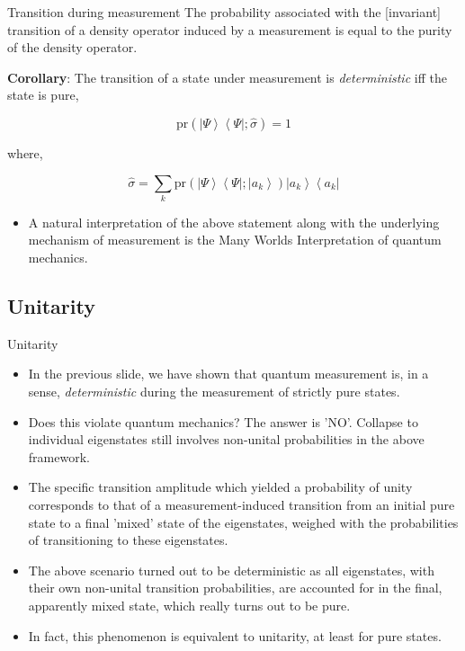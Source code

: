 \documentclass[9pt,handout]{beamer}
\newcommand{\pr}[0]{\text{pr}}
\begin{document}
\begin{frame}{}
\begin{block}{Transition during measurement}
The probability associated with the [invariant] transition of a density operator induced by a measurement is equal to the purity of the density operator.

\textbf{Corollary}: The transition of a state under measurement is \emph{deterministic} iff the state is pure,

$$\pr \left( \left\lvert \Psi \right\rangle \left\langle \Psi \right\rvert; \widehat{\sigma} \right) = 1$$

where,

$$\widehat{\sigma} = \sum_k \pr \left( \left\lvert \Psi \right\rangle \left\langle \Psi \right\rvert; \left\lvert a_k \right\rangle \right) \left\lvert a_k \right\rangle \left\langle a_k \right\rvert$$
\end{block}

\begin{itemize}
\item A natural interpretation of the above statement along with the underlying mechanism of measurement is the Many Worlds Interpretation of quantum mechanics.
\end{itemize}
\end{frame}

\subsection{Unitarity}
\begin{frame}{Unitarity}
\begin{itemize}
\item In the previous slide, we have shown that quantum measurement is, in a sense, \emph{deterministic} during the measurement of strictly pure states.

\item Does this violate quantum mechanics? The answer is 'NO'. 
Collapse to individual eigenstates still involves non-unital probabilities in the above framework.

\item The specific transition amplitude which yielded a probability of unity corresponds to that of a measurement-induced transition from an initial pure state to a final 'mixed' state of the eigenstates, weighed with the probabilities of transitioning to these eigenstates.

\item The above scenario turned out to be deterministic as all eigenstates, with their own non-unital transition probabilities, are accounted for in the final, apparently mixed state, which really turns out to be pure.

\item In fact, this phenomenon is equivalent to unitarity, at least for pure states.
\end{itemize}
\end{frame}
\end{document}
